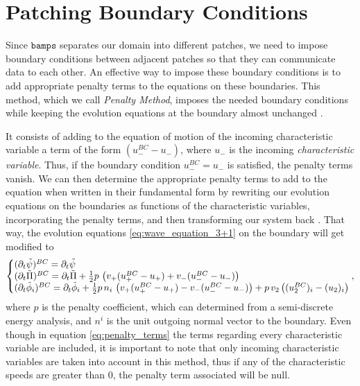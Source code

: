 \section{Patching Boundary Conditions}
\label{section:Patch_Boundaries}

Since $\texttt{bamps}$ separates our domain into different patches, we need to impose boundary conditions between adjacent patches so that they can communicate data to each other. An effective way to impose these boundary conditions is to add appropriate penalty terms to the equations on these boundaries. This method, which we call \textit{Penalty Method}, imposes the needed boundary conditions while keeping the evolution equations at the boundary almost unchanged \cite{Pseudospectral_method_for_gravitational_wave_collapse,Spectral_methods_for_the_wave_equation_in_second-order_form}.

It consists of adding to the equation of motion of the incoming characteristic variable a term of the form $(u_-^{BC}  - u_-)$, where $u_-$ is the incoming \textit{characteristic variable}. Thus, if the boundary condition $u_-^{BC} = u_-$ is satisfied, the penalty terms vanish. We can then determine the appropriate penalty terms to add to the equation when written in their fundamental form by rewriting our evolution equations on the boundaries as functions of the characteristic variables, incorporating the penalty terms, and then transforming our system back \cite{Pseudospectral_method_for_gravitational_wave_collapse,Spectral_methods_for_the_wave_equation_in_second-order_form}. That way, the evolution equations \eqref{eq:wave_equation_3+1} on the boundary will get modified to
%
\begin{align}
    \left\{\begin{array}{@{}l@{}} 
        (\partial_t\tilde{\psi})^{BC} = \partial_t\tilde{\psi} \\
        (\partial_t\tilde{\Pi})^{BC} = \partial_t\tilde{\Pi} + \frac{1}{2} p \, \left( v_+(u_+^{BC}  - u_+) + v_- (u_-^{BC}  - u_-) \right) \\
        (\partial_t\tilde{\phi}_i)^{BC} = \partial_t\tilde{\phi}_i + \frac{1}{2} p \, n_i \, \left( v_+(u_+^{BC}  - u_+) - v_- (u_-^{BC}  - u_-) \right)  + p \, v_2 \left((u_2^{BC})_i  - (u_2)_i \right) \\
    \end{array}\right. ,
    \label{eq:penalty_terms}
\end{align}
%
where $p$ is the penalty coefficient, which can determined from a semi-discrete energy analysis, and $n^i$ is the unit outgoing normal vector to the boundary. Even though in equation \eqref{eq:penalty_terms} the terms regarding every characteristic variable are included, it is important to note that only incoming characteristic variables are taken into account in this method, thus if any of the characteristic speeds are greater than $0$, the penalty term associated will be null. 

